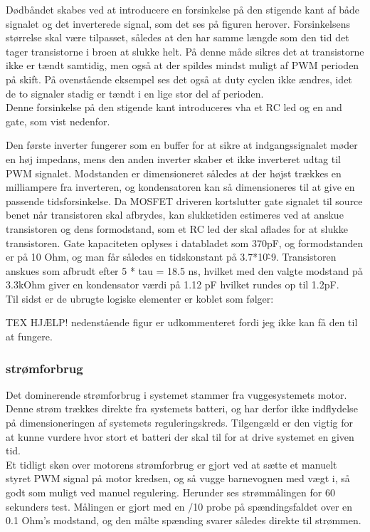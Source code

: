 
Dødbåndet skabes ved at introducere en forsinkelse på den stigende kant af både signalet og det inverterede signal, som det ses på figuren herover. Forsinkelsens størrelse skal være tilpasset, således at den har samme længde som den tid det tager transistorne i broen at slukke helt. På denne måde sikres det at transistorne ikke er tændt samtidig, men også at der spildes mindst muligt af PWM perioden på skift.
På ovenstående eksempel ses det også at duty cyclen ikke ændres, idet de to signaler stadig er tændt i en lige stor del af perioden.\\
Denne forsinkelse på den stigende kant introduceres vha et RC led og en and gate, som vist nedenfor.


Den første inverter fungerer som en buffer for at sikre at indgangssignalet møder en høj impedans, mens den anden inverter skaber et ikke inverteret udtag til PWM signalet. Modstanden er dimensioneret således at der højst trækkes en milliampere fra inverteren, og kondensatoren kan så dimensioneres til at give en passende tidsforsinkelse. Da MOSFET driveren kortslutter gate signalet til source benet når transistoren skal afbrydes, kan slukketiden estimeres ved at anskue transistoren og dens formodstand, som et RC led der skal aflades for at slukke transistoren. Gate kapaciteten oplyses i databladet som 370pF, og formodstanden er på 10 Ohm, og man får således en tidskonstant på 3.7*10\^-9. Transistoren anskues som afbrudt efter 5 * tau = 18.5 ns, hvilket med den valgte modstand på 3.3kOhm giver en kondensator værdi på 1.12 pF hvilket rundes op til 1.2pF. \\
Til sidst er de ubrugte logiske elementer er koblet som følger:

TEX HJÆLP! nedenstående figur er udkommenteret fordi jeg ikke kan få den til at fungere.

\subsubsection{strømforbrug}
Det dominerende strømforbrug i systemet stammer fra vuggesystemets motor. Denne strøm trækkes direkte fra systemets batteri, og har derfor ikke indflydelse på dimensioneringen af systemets reguleringskreds. Tilgengæld er den vigtig for at kunne vurdere hvor stort et batteri der skal til for at drive systemet en given tid.\\ 
Et tidligt skøn over motorens strømforbrug er gjort ved at sætte et manuelt styret PWM signal på motor kredsen, og så vugge barnevognen med vægt i, så godt som muligt ved manuel regulering. Herunder ses strømmålingen for 60 sekunders test. Målingen er gjort med en /10 probe på spændingsfaldet over en 0.1 Ohm's modstand, og den målte spænding svarer således direkte til strømmen.\\


